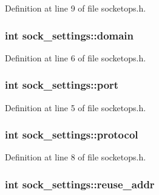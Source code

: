 Definition at line 9 of file socketops.\-h.

\hypertarget{structsock__settings_a95727084b18e3c1923a219e15260d79b}{
\subsubsection[{domain}]{\setlength{\rightskip}{0pt plus 5cm}int sock\-\_\-settings\-::domain}}\label{structsock__settings_a95727084b18e3c1923a219e15260d79b}


Definition at line 6 of file socketops.\-h.

\hypertarget{structsock__settings_aef86a0ad1b9e93d1a5b5c0c27f9336f8}{
\subsubsection[{port}]{\setlength{\rightskip}{0pt plus 5cm}int sock\-\_\-settings\-::port}}\label{structsock__settings_aef86a0ad1b9e93d1a5b5c0c27f9336f8}


Definition at line 5 of file socketops.\-h.

\hypertarget{structsock__settings_a938f8fc4b2ec0de16c809d4cc1d301da}{
\subsubsection[{protocol}]{\setlength{\rightskip}{0pt plus 5cm}int sock\-\_\-settings\-::protocol}}\label{structsock__settings_a938f8fc4b2ec0de16c809d4cc1d301da}


Definition at line 8 of file socketops.\-h.

\hypertarget{structsock__settings_a912e4c6ee79af4d8d259b7c85239a7f7}{
\subsubsection[{reuse\-\_\-addr}]{\setlength{\rightskip}{0pt plus 5cm}int sock\-\_\-settings\-::reuse\-\_\-addr}}\label{structsock__settings_a912e4c6ee79af4d8d259b7c85239a7f7}


